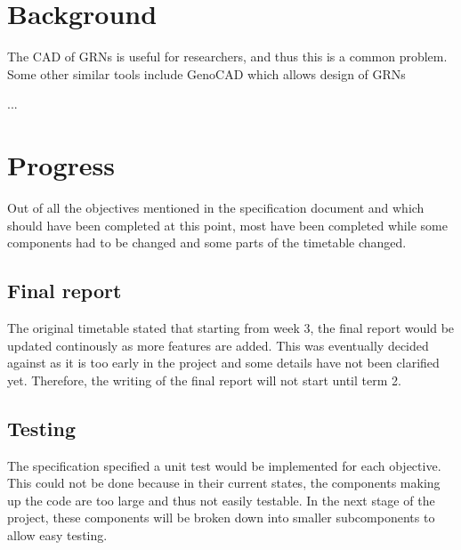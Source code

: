 \documentclass{article}
\begin{document}
	
	
	\section{Background}
	

	
	The CAD of GRNs is useful for researchers, and thus this is a common problem. Some other similar tools include GenoCAD which allows design of GRNs
	
	...
	
	
	
	\section{Progress}
	Out of all the objectives mentioned in the specification document and which should have been completed at this point, most have been completed while some components had to be changed and some parts of the timetable changed.
	
	
	
	\subsection{Final report} 
	The original timetable stated that starting from week 3, the final report would be updated continously as more features are added. This was eventually decided against as it is too early in the project and some details have not been clarified yet. Therefore, the writing of the final report will not start until term 2.
	
	\subsection{Testing} \label{progress-testing}
	The specification specified a unit test would be implemented for each objective. This could not be done because in their current states, the components making up the code are too large and thus not easily testable. In the next stage of the project, these components will be broken down into smaller subcomponents to allow easy testing.
	
\end{document}
